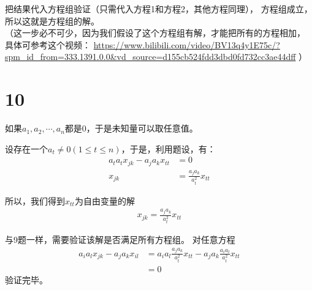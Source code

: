 \documentclass{article}
\begin{document}
把结果代入方程组验证（只需代入方程1和方程2，其他方程同理），
方程组成立，所以这就是方程组的解。\\
（这一步必不可少，因为我们假设了这个方程组有解，才能把所有的方程相加，
具体可参考这个视频：
\url{https://www.bilibili.com/video/BV13q4y1E75c/?spm_id_from=333.1391.0.0&vd_source=d155cb524fdd3dbd0fd732cc3ae44dff}
）

\section*{10}

如果$a_1,a_2, \cdots, a_n$都是$0$，于是未知量可以取任意值。

设存在一个$a_t \neq 0 (1 \leq t \leq n) $，于是，利用题设，有：
\begin{align*}
  a_ta_t x_{jk} - a_j a_k x_{tt} & = 0                            \\
  x_{jk}                         & = \frac{a_j a_k}{a_t^2} x_{tt}
\end{align*}

所以，我们得到$x_{tt}$为自由变量的解
\begin{align*}
  x_{jk} = \frac{a_j a_k}{a_t^2} x_{tt}
\end{align*}

与9题一样，需要验证该解是否满足所有方程组。
对任意方程
\begin{align*}
  a_ia_l x_{jk} - a_ja_k x_{il} & = a_ia_l \frac{a_j a_k}{a_t^2} x_{tt} - a_ja_k \frac{a_i a_l}{a_t^2} x_{tt} \\
                                & = 0
\end{align*}
验证完毕。
\end{document}

